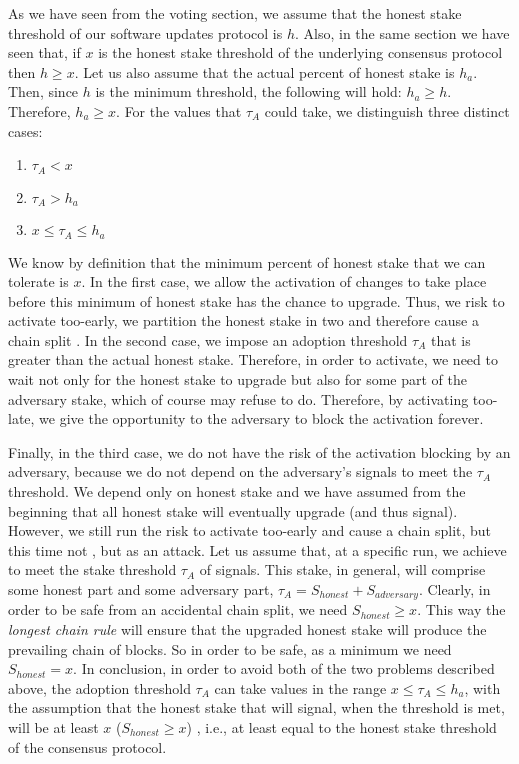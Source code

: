 As we have seen from the voting section, we assume that the honest stake threshold of our software updates protocol is $h$. Also, in the same section we have seen that, if $x$ is the honest stake threshold of the underlying consensus protocol then $h \geq x$. Let us also assume that the actual percent of honest stake is $h_a$. Then, since $h$ is the minimum threshold, the following will hold: $ h_a \geq h$. Therefore, $h_a \geq x$. For the values that $\tau_A$ could take, we distinguish three distinct cases:
\begin{enumerate}
\item $\tau_A < x$
\item $\tau_A > h_a$
\item $ x \leq \tau_A \leq h_a$
\end{enumerate}
We know by definition that the minimum percent of honest stake that we can tolerate is $x$. In the first case, we allow the activation of changes to take place before this minimum of honest stake has the chance to upgrade. Thus, we risk to activate too-early, we partition the honest stake in two and therefore cause a chain split . In the second case, we impose an adoption threshold $\tau_A$ that is greater than the actual honest stake. Therefore, in order to activate, we need to wait not only for the honest stake to upgrade but also for some part of the adversary stake, which of course may refuse to do. Therefore, by activating too-late, we give the opportunity to the adversary to block the activation forever.

Finally, in the third case, we do not have the risk of the activation blocking by an adversary, because we do not depend on the adversary's signals to meet the $\tau_A$ threshold. We depend only on honest stake and we have assumed from the beginning that all honest stake will eventually upgrade (and thus signal). However, we still run the risk to activate too-early and cause a chain split, but this time not , but as an attack. Let us assume that, at a specific run, we achieve to meet the stake threshold $\tau_A$ of signals. This stake, in general, will comprise some honest part and some adversary part, $\tau_A = S_{honest} + S_{adversary}$. Clearly, in order to be safe from an accidental chain split, we need $S_{honest} \geq x$. This way the \emph{longest chain rule} will ensure that the upgraded honest stake will produce the prevailing chain of blocks. So in order to be safe, as a minimum we need $S_{honest} = x$. In conclusion, in order to avoid both of the two problems described above, the adoption threshold $\tau_A$ can take values in the range $x \leq \tau_A \leq h_a$, with the assumption that the honest stake that will signal, when the threshold is met, will be at least $x$ ($S_{honest} \geq x$) , i.e., at least equal to the honest stake threshold of the consensus protocol. 

